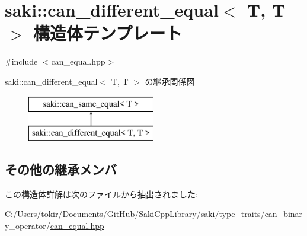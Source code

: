 \hypertarget{structsaki_1_1can__different__equal_3_01_t_00_01_t_01_4}{}\section{saki\+:\+:can\+\_\+different\+\_\+equal$<$ T, T $>$ 構造体テンプレート}
\label{structsaki_1_1can__different__equal_3_01_t_00_01_t_01_4}


{\ttfamily \#include $<$can\+\_\+equal.\+hpp$>$}

saki\+:\+:can\+\_\+different\+\_\+equal$<$ T, T $>$ の継承関係図\begin{figure}[H]
\begin{center}
\leavevmode
\includegraphics[height=2.000000cm]{structsaki_1_1can__different__equal_3_01_t_00_01_t_01_4}
\end{center}
\end{figure}
\subsection*{その他の継承メンバ}


この構造体詳解は次のファイルから抽出されました\+:\begin{DoxyCompactItemize}
\item 
C\+:/\+Users/tokir/\+Documents/\+Git\+Hub/\+Saki\+Cpp\+Library/saki/type\+\_\+traits/can\+\_\+binary\+\_\+operator/\mbox{\hyperlink{can__equal_8hpp}{can\+\_\+equal.\+hpp}}\end{DoxyCompactItemize}
